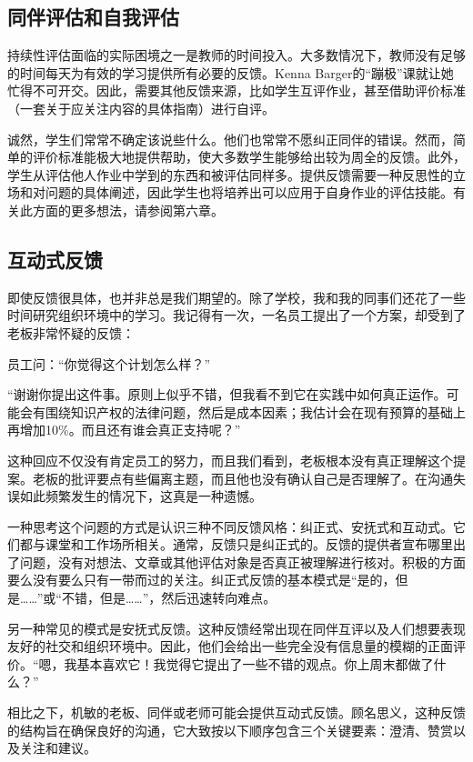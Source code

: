 \subsection*{同伴评估和自我评估}

持续性评估面临的实际困境之一是教师的时间投入。大多数情况下，教师没有足够的时间每天为有效的学习提供所有必要的反馈。Kenna Barger的“蹦极”课就让她忙得不可开交。因此，需要其他反馈来源，比如学生互评作业，甚至借助评价标准（一套关于应关注内容的具体指南）进行自评。

诚然，学生们常常不确定该说些什么。他们也常常不愿纠正同伴的错误。然而，简单的评价标准能极大地提供帮助，使大多数学生能够给出较为周全的反馈。此外，学生从评估他人作业中学到的东西和被评估同样多。提供反馈需要一种反思性的立场和对问题的具体阐述，因此学生也将培养出可以应用于自身作业的评估技能。有关此方面的更多想法，请参阅第六章。

\subsection*{互动式反馈}

即使反馈很具体，也并非总是我们期望的。除了学校，我和我的同事们还花了一些时间研究组织环境中的学习。我记得有一次，一名员工提出了一个方案，却受到了老板非常怀疑的反馈：

员工问：“你觉得这个计划怎么样？”

“谢谢你提出这件事。原则上似乎不错，但我看不到它在实践中如何真正运作。可能会有围绕知识产权的法律问题，然后是成本因素；我估计会在现有预算的基础上再增加10\%。而且还有谁会真正支持呢？”

这种回应不仅没有肯定员工的努力，而且我们看到，老板根本没有真正理解这个提案。老板的批评要点有些偏离主题，而且他也没有确认自己是否理解了。在沟通失误如此频繁发生的情况下，这真是一种遗憾。

一种思考这个问题的方式是认识三种不同反馈风格：纠正式、安抚式和互动式。它们都与课堂和工作场所相关。通常，反馈只是纠正式的。反馈的提供者宣布哪里出了问题，没有对想法、文章或其他评估对象是否真正被理解进行核对。积极的方面要么没有要么只有一带而过的关注。纠正式反馈的基本模式是“是的，但是……”或“不错，但是……”，然后迅速转向难点。

另一种常见的模式是安抚式反馈。这种反馈经常出现在同伴互评以及人们想要表现友好的社交和组织环境中。因此，他们会给出一些完全没有信息量的模糊的正面评价。“嗯，我基本喜欢它！我觉得它提出了一些不错的观点。你上周末都做了什么？”

相比之下，机敏的老板、同伴或老师可能会提供互动式反馈。顾名思义，这种反馈的结构旨在确保良好的沟通，它大致按以下顺序包含三个关键要素：澄清、赞赏以及关注和建议。


